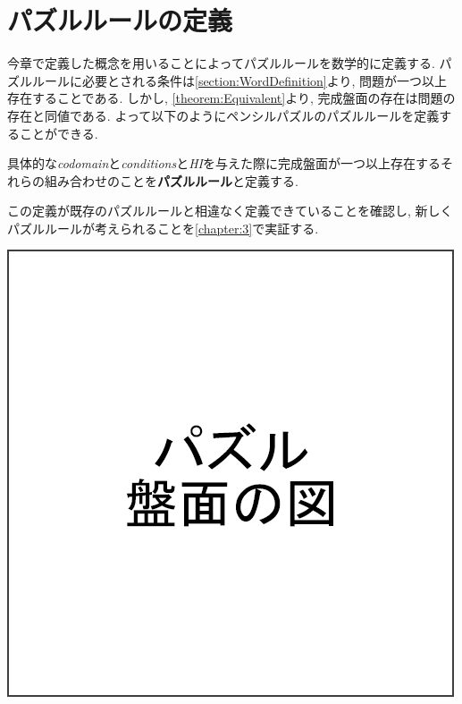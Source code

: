 \section{パズルルールの定義}\label{section:PuzzleRuleDefinition}
今章で定義した概念を用いることによってパズルルールを数学的に定義する. パズルルールに必要とされる条件は\cref{section:WordDefinition}より, 問題が一つ以上存在することである. しかし, \cref{theorem:Equivalent}より, 完成盤面の存在は問題の存在と同値である. よって以下のようにペンシルパズルのパズルルールを定義することができる.
\begin{definition}[パズルルール]\label{definition:PuzzleRule}
  具体的な\textit{codomain}と\textit{conditions}と\textit{HI}を与えた際に完成盤面が一つ以上存在するそれらの組み合わせのことを\textbf{パズルルール}と定義する.
\end{definition}
この定義が既存のパズルルールと相違なく定義できていることを確認し, 新しくパズルルールが考えられることを\cref{chapter:3}で実証する.





\begin{clearpagefigure}
  \includegraphics[width=0.8\linewidth,clip]{fig/board.png}
  \caption{}
  \label{figure:Board}
\end{clearpagefigure}

